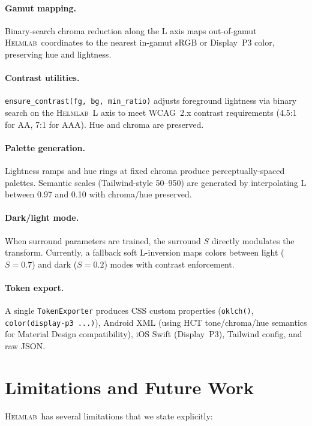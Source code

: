 \documentclass[11pt, twocolumn]{article}
\newcommand{\helmlab}{\textsc{Helmlab}}
\begin{document}
\paragraph{Gamut mapping.}
Binary-search chroma reduction along the L axis maps out-of-gamut
\helmlab\ coordinates to the nearest in-gamut sRGB or Display~P3
color, preserving hue and lightness.

\paragraph{Contrast utilities.}
\texttt{ensure\_contrast(fg, bg, min\_ratio)} adjusts foreground
lightness via binary search on the \helmlab\ L axis to meet
WCAG~2.x contrast requirements (4.5:1 for AA, 7:1 for AAA).
Hue and chroma are preserved.

\paragraph{Palette generation.}
Lightness ramps and hue rings at fixed chroma produce
perceptually-spaced palettes. Semantic scales (Tailwind-style
50--950) are generated by interpolating L between 0.97 and 0.10
with chroma/hue preserved.

\paragraph{Dark/light mode.}
When surround parameters are trained, the surround $S$ directly
modulates the transform. Currently, a fallback soft L-inversion
maps colors between light ($S=0.7$) and dark ($S=0.2$) modes
with contrast enforcement.

\paragraph{Token export.}
A single \texttt{TokenExporter} produces CSS custom properties
(\texttt{oklch()}, \texttt{color(display-p3 ...)}), Android XML
(using HCT tone/chroma/hue semantics for Material Design
compatibility), iOS Swift (Display~P3), Tailwind config, and
raw JSON.


\section{Limitations and Future Work}
\label{sec:limitations}

\helmlab\ has several limitations that we state explicitly:
\end{document}
